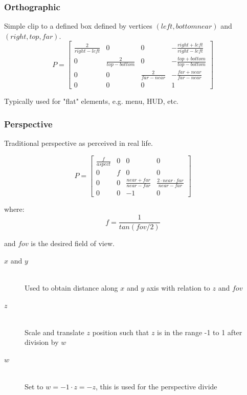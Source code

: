 \documentclass[a4paper]{article}
\begin{document}
\subsubsection{Orthographic}

Simple clip to a defined box defined by vertices $(left, bottom near)$ and
$(right, top, far)$.
\[
  P =
  \left [
    \begin{array}{cccc}
      \frac{2}{right - left}  & 0                       & 0                     & -\frac{right + left}{right - left} \\
      0                       & \frac{2}{top - bottom}  & 0                     & -\frac{top + bottom}{top - bottom} \\
      0                       & 0                       & \frac{2}{far - near}  & -\frac{far + near}{far - near} \\
      0                       & 0                       & 0                     & 1
    \end{array}
  \right ]
\]

Typically used for "flat" elements, e.g. menu, HUD, etc.

\subsubsection{Perspective}

Traditional perspective as perceived in real life.

\[
  P =
  \left [
    \begin{array}{cccc}
      \frac{f}{aspect}  & 0 & 0                             & 0 \\
      0                 & f & 0                             & 0 \\
      0                 & 0 & \frac{near + far}{near - far} & \frac{2 \cdot near \cdot far}{near - far} \\
      0                 & 0 & -1                            & 0
    \end{array}
  \right ]
\]

where:
\[
  f = \frac{1}{tan(fov / 2)}
\]

and $fov$ is the desired field of view.

\begin{description}
  \item[$x$ and $y$] \hfill \\
    Used to obtain distance along $x$ and $y$ axis with relation to $z$ and
    $fov$

  \item[$z$] \hfill \\
    Scale and translate $z$ position such that $z$ is in the range -1 to 1 after
    division by $w$

  \item[$w$] \hfill \\
    Set to $w = -1 \cdot z = -z$, this is used for the perspective divide

\end{description}
\end{document}
